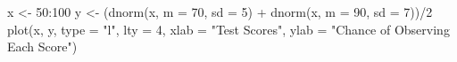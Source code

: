 \begin{Schunk}
\begin{Sinput}
 x <- 50:100
 y <- (dnorm(x, m = 70, sd = 5) + dnorm(x, m = 90, sd = 7))/2
 plot(x, y, type = "l", lty = 4, xlab = "Test Scores", ylab = "Chance of Observing Each Score")
\end{Sinput}
\end{Schunk}
